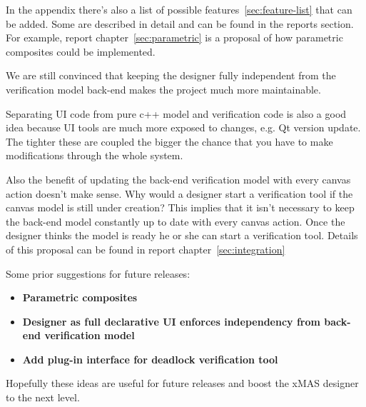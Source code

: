 In the appendix there's also a list of possible features~\ref{sec:feature-list}
that can be added. Some are described in detail and can be found in the
reports section. For example, report chapter~\ref{sec:parametric} is a proposal
of how parametric composites could be implemented.

We are still convinced that keeping the designer fully independent from the
verification model back-end makes the project much more maintainable.

Separating UI code from pure c++ model and verification code is also a good idea
because UI tools are much more exposed to changes, e.g. Qt version update. The
tighter these are coupled the bigger the chance that you have to make
modifications through the whole system.

Also the benefit of updating the back-end verification model with every canvas
action doesn't make sense. Why would a designer start a verification tool if the
canvas model is still under creation? This implies that it isn't necessary to
keep the back-end model constantly up to date with every canvas action. Once the
designer thinks the model is ready he or she can start a verification tool.
Details of this proposal can be found in report chapter~\ref{sec:integration}

\vspace{0.5 cm}
\begin{tcolorbox}[colback=white]
Some prior suggestions for future releases:
\begin{itemize}
\item \textbf{Parametric composites}
\item \textbf{Designer as full declarative UI enforces independency from back-end verification model}
\item \textbf{Add plug-in interface for deadlock verification tool}
\end{itemize}
\end{tcolorbox}

Hopefully these ideas are useful for future releases and boost the xMAS designer
to the next level.













